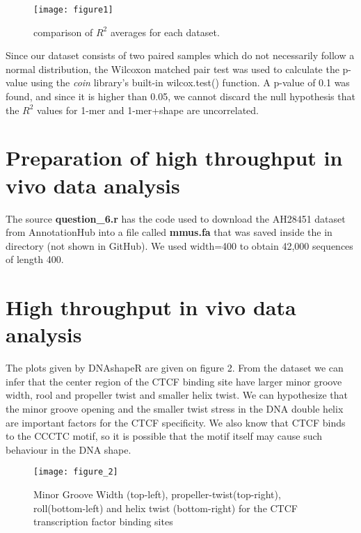 \documentclass[11pt]{article}
\begin{document}
\begin{figure}
\texttt{[image: figure1]}
\caption{comparison of $R^2$ averages for each dataset.}
\end{figure}

Since our dataset consists of two paired samples which do not necessarily follow a normal distribution, the Wilcoxon matched pair test was used to calculate the p-value using the \emph{coin} library's built-in wilcox.test() function. A p-value of 0.1 was found, and since it is higher than 0.05, we cannot discard the null hypothesis that the $R^2$ values for 1-mer and 1-mer+shape are uncorrelated. 

\section{Preparation of high throughput in vivo data analysis}
The source \textbf{question\_6.r} has the code used to download the AH28451 dataset from AnnotationHub into a file called \textbf{mmus.fa} that was saved inside the in directory (not shown in GitHub). We used width=400 to obtain 42,000 sequences of length 400. 

\section{High throughput in vivo data analysis}

The plots given by DNAshapeR are given on figure 2. From the dataset we can infer that the center region of the CTCF binding site have larger minor groove width, rool and propeller twist and smaller helix twist. We can hypothesize that the minor groove opening and the smaller twist stress in the DNA double helix are important factors for the CTCF specificity. We also know that CTCF binds to the CCCTC motif, so it is possible that the motif itself may cause such behaviour in the DNA shape. 

\begin{figure}
\texttt{[image: figure\_2]}
\caption{Minor Groove Width (top-left), propeller-twist(top-right), roll(bottom-left) and helix twist (bottom-right) for the CTCF transcription factor binding sites}
\end{figure}
\end{document}
